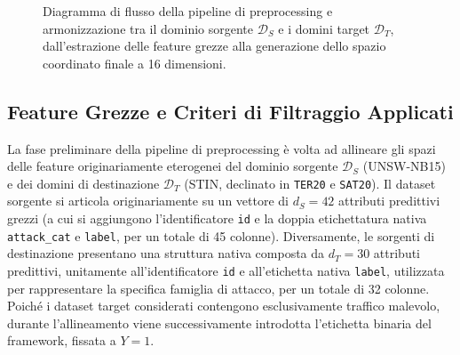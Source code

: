 \begin{figure}[H]
\caption{Diagramma di flusso della pipeline di preprocessing e armonizzazione tra il dominio sorgente $\mathcal{D}_S$ e i domini target $\mathcal{D}_T$, dall'estrazione delle feature grezze alla generazione dello spazio coordinato finale a 16 dimensioni.}
\label{fig:preprocessing_pipeline}
\end{figure}

\subsection{Feature Grezze e Criteri di Filtraggio Applicati}
\label{subsec:feature_grezze}

La fase preliminare della pipeline di preprocessing è volta ad allineare gli spazi delle feature originariamente eterogenei del dominio sorgente $\mathcal{D}_S$ (UNSW-NB15) e dei domini di destinazione $\mathcal{D}_T$ (STIN, declinato in \texttt{TER20} e \texttt{SAT20}). 
Il dataset sorgente si articola originariamente su un vettore di $d_S = 42$ attributi predittivi grezzi (a cui si aggiungono l'identificatore \texttt{id} e la doppia etichettatura nativa \texttt{attack\_cat} e \texttt{label}, per un totale di 45 colonne). 
Diversamente, le sorgenti di destinazione presentano una struttura nativa composta da $d_T=30$ attributi predittivi, unitamente all'identificatore \texttt{id} e all'etichetta nativa \texttt{label}, utilizzata per rappresentare la specifica famiglia di attacco, per un totale di 32 colonne. Poiché i dataset target considerati contengono esclusivamente traffico malevolo, durante l'allineamento viene successivamente introdotta l'etichetta binaria del framework, fissata a $Y=1$.

